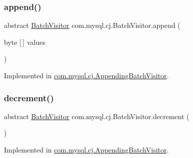 \subsubsection{\texorpdfstring{append()}{append()}}
{\footnotesize\ttfamily abstract \mbox{\hyperlink{interfacecom_1_1mysql_1_1cj_1_1_batch_visitor}{Batch\+Visitor}} com.\+mysql.\+cj.\+Batch\+Visitor.\+append (\begin{DoxyParamCaption}\item[{byte \mbox{[}$\,$\mbox{]}}]{values }\end{DoxyParamCaption})\hspace{0.3cm}{\ttfamily [abstract]}}



Implemented in \mbox{\hyperlink{classcom_1_1mysql_1_1cj_1_1_appending_batch_visitor_ab8ff7b399d4a2f5c99b0a08afae95012}{com.\+mysql.\+cj.\+Appending\+Batch\+Visitor}}.

\mbox{\label{interfacecom_1_1mysql_1_1cj_1_1_batch_visitor_ad9fc024937c7d03fe39f3c4f1a6a5069}} 
\subsubsection{\texorpdfstring{decrement()}{decrement()}}
{\footnotesize\ttfamily abstract \mbox{\hyperlink{interfacecom_1_1mysql_1_1cj_1_1_batch_visitor}{Batch\+Visitor}} com.\+mysql.\+cj.\+Batch\+Visitor.\+decrement (\begin{DoxyParamCaption}{ }\end{DoxyParamCaption})\hspace{0.3cm}{\ttfamily [abstract]}}



Implemented in \mbox{\hyperlink{classcom_1_1mysql_1_1cj_1_1_appending_batch_visitor_a1f3469887d7b40e881ceb47bb912ec07}{com.\+mysql.\+cj.\+Appending\+Batch\+Visitor}}.

\mbox{\label{interfacecom_1_1mysql_1_1cj_1_1_batch_visitor_a4778f6e4d4c046653767d232f547c1f2}} 
